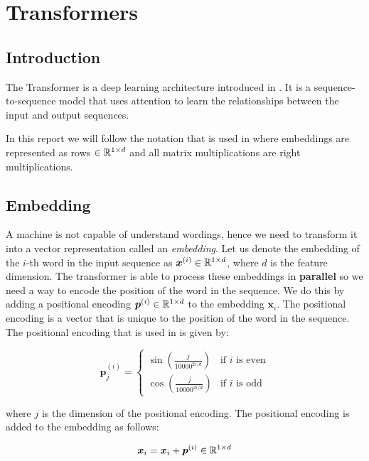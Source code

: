 \documentclass[../main.tex]{subfiles}
\begin{document}
\section{Transformers}
\subsection{Introduction}

The Transformer is a deep learning architecture introduced in \cite{vaswani2017attention}. It is a sequence-to-sequence model that uses attention to learn the relationships between the input and output sequences.

In this report we will follow the notation that is used in \cite{vaswani2017attention} where embeddings are represented as rows $\in \mathbb{R}^{1 \times d}$ and all matrix multiplications are right multiplications. 

\subsection{Embedding}

A machine is not capable of understand wordings, hence we need to transform it into a vector representation called an \emph{embedding}. Let us denote the embedding of the $i$-th word in the input sequence as $\bm{x}^{(i)} \in \mathbb{R}^{1 \times d}$, where $d$ is the feature dimension. The transformer is able to process these embeddings in \textbf{parallel} so we need a way to encode the position of the word in the sequence. We do this by adding a positional encoding $\bm{p}^{(i)} \in \mathbb{R}^{1 \times d}$ to the embedding $\bm{x}_i$. The positional encoding is a vector that is unique to the position of the word in the sequence. The positional encoding that is used in \cite{vaswani2017attention} is given by:

\begin{equation}
	\bm{p}_j^{(i)} = \begin{cases}
		\sin\left(\frac{j}{10000^{2i/d}}\right) & \text{if } i \text{ is even} \\
		\cos\left(\frac{j}{10000^{2i/d}}\right) & \text{if } i \text{ is odd}
	\end{cases}
\end{equation}

\noi where $j$ is the dimension of the positional encoding. The positional encoding is added to the embedding as follows:

\begin{equation}
	\bm{x}_i = \bm{x}_i + \bm{p}^{(i)} \in \mathbb{R}^{1 \times d}
\end{equation}
\end{document}
